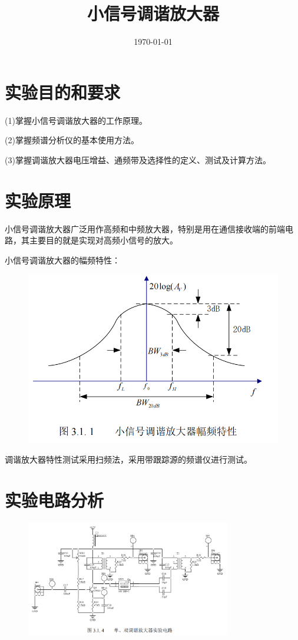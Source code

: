 \documentclass{../source/Experiment}
\title{小信号调谐放大器}
\date{\today}
\begin{document}
\section{实验目的和要求}
 (1)掌握小信号调谐放大器的工作原理。

(2)掌握频谱分析仪的基本使用方法。

(3)掌握调谐放大器电压增益、通频带及选择性的定义、测试及计算方法。

\section{实验原理}
小信号调谐放大器广泛用作高频和中频放大器，特别是用在通信接收端的前端电路，其主要目的就是实现对高频小信号的放大。

小信号调谐放大器的幅频特性：
\begin{figure}[H]
    \centering
    \includegraphics[scale=0.4]{pic/fig1.png}
\end{figure}

调谐放大器特性测试采用扫频法，采用带跟踪源的频谱仪进行测试。

\section{实验电路分析}

\begin{figure}[H]
    \centering
    \includegraphics[width = 0.8\textwidth]{pic/fig2.png}
\end{figure}
\end{document}
